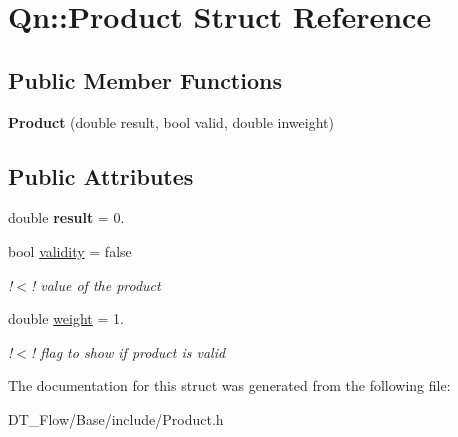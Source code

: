 \hypertarget{structQn_1_1Product}{}\section{Qn\+:\+:Product Struct Reference}
\label{structQn_1_1Product}
\subsection*{Public Member Functions}
\begin{DoxyCompactItemize}
\item 
\mbox{\label{structQn_1_1Product_a6b1e4f575d62b58247b0188256815663}} 
{\bfseries Product} (double result, bool valid, double inweight)
\end{DoxyCompactItemize}
\subsection*{Public Attributes}
\begin{DoxyCompactItemize}
\item 
\mbox{\label{structQn_1_1Product_ae0264d0cb7cc15f3acd10d7475ef43fa}} 
double {\bfseries result} = 0.
\item 
\mbox{\label{structQn_1_1Product_ae7f162e1fba2cf8ba29d407ac7ed01ae}} 
bool \mbox{\hyperlink{structQn_1_1Product_ae7f162e1fba2cf8ba29d407ac7ed01ae}{validity}} = false
\begin{DoxyCompactList}\small\item\em !$<$! value of the product \end{DoxyCompactList}\item 
\mbox{\label{structQn_1_1Product_a95ed75911974232fdfe1a8a648d89bdc}} 
double \mbox{\hyperlink{structQn_1_1Product_a95ed75911974232fdfe1a8a648d89bdc}{weight}} = 1.
\begin{DoxyCompactList}\small\item\em !$<$! flag to show if product is valid \end{DoxyCompactList}\end{DoxyCompactItemize}


The documentation for this struct was generated from the following file\+:\begin{DoxyCompactItemize}
\item 
D\+T\+\_\+\+Flow/\+Base/include/Product.\+h\end{DoxyCompactItemize}
